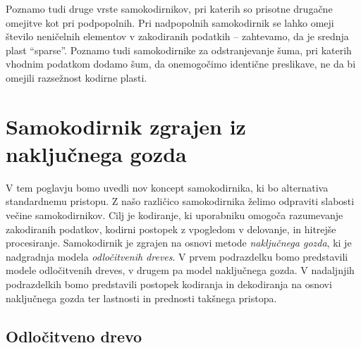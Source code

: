 \documentclass[12pt,a4paper,twoside]{article}
\theoremstyle{definition} %
\theoremstyle{plain} %
\numberwithin{equation}{section}  %
\begin{document}

Poznamo tudi druge vrste samokodirnikov, pri katerih so prisotne drugačne omejitve kot pri podpopolnih.
Pri nadpopolnih samokodirnik se lahko omeji število neničelnih elementov v zakodiranih podatkih -- zahtevamo, da je srednja plast ``sparse''.
Poznamo tudi samokodirnike za odstranjevanje šuma, pri katerih vhodnim podatkom dodamo šum, da onemogočimo identične preslikave, ne da bi omejili razsežnost kodirne plasti.






\section{Samokodirnik zgrajen iz naključnega gozda}
\label{pogl:rf_samokodirnik}

V tem poglavju bomo uvedli nov koncept samokodirnika, ki bo alternativa standardnemu pristopu. 
Z našo različico samokodirnika želimo odpraviti slabosti večine samokodirnikov. 
Cilj je kodiranje, ki uporabniku omogoča razumevanje zakodiranih podatkov, kodirni postopek z vpogledom v delovanje, in hitrejše procesiranje. 
Samokodirnik je zgrajen na osnovi metode \emph{naključnega gozda}, ki je nadgradnja modela \emph{odločitvenih dreves}.
V prvem podrazdelku bomo predstavili modele odločitvenih dreves, v drugem pa model naključnega gozda. 
V nadaljnjih podrazdelkih bomo predstavili postopek kodiranja in dekodiranja na osnovi naključnega gozda ter lastnosti in prednosti takšnega pristopa.


\subsection{Odločitveno drevo}
\end{document}
